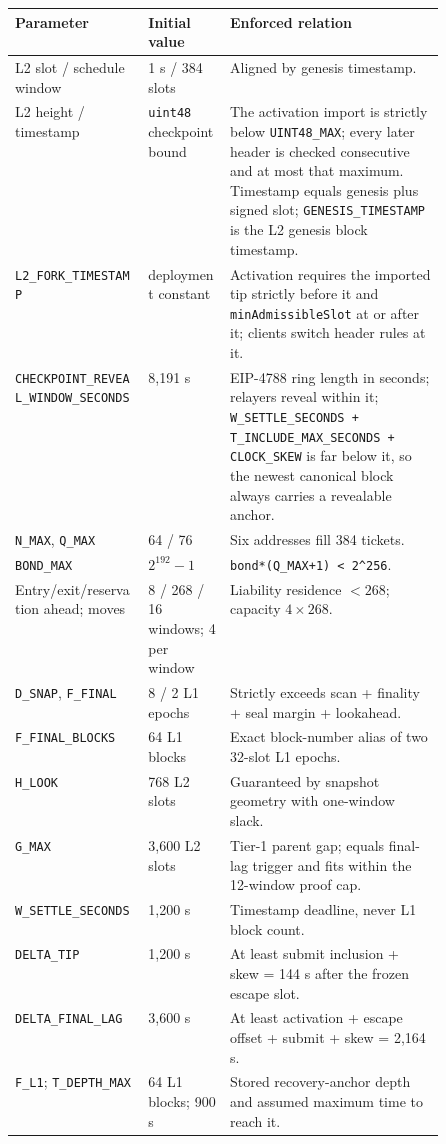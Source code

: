 \documentclass[a4paper,11pt]{article}
\newcommand{\code}[1]{\nolinkurl{#1}}
\begin{document}
\begin{xltabular}{\linewidth}{p{0.31\linewidth}p{0.19\linewidth}X}
\toprule
\textbf{Parameter} & \textbf{Initial value} & \textbf{Enforced relation} \\
\midrule
L2 slot / schedule window & 1 s / 384 slots & Aligned by genesis timestamp. \\
L2 height / timestamp & \code{uint48} checkpoint bound & The activation import is strictly below \code{UINT48_MAX}; every later header is checked consecutive and at most that maximum.  Timestamp equals genesis plus signed slot; \code{GENESIS_TIMESTAMP} is the L2 genesis block timestamp. \\
\code{L2_FORK_TIMESTAMP} & deployment constant & Activation requires the imported tip strictly before it and \code{minAdmissibleSlot} at or after it; clients switch header rules at it. \\
\code{CHECKPOINT_REVEAL_WINDOW_SECONDS} & 8,191 s & EIP-4788 ring length in seconds; relayers reveal within it; \code{W_SETTLE_SECONDS + T_INCLUDE_MAX_SECONDS + CLOCK_SKEW} is far below it, so the newest canonical block always carries a revealable anchor. \\
\code{N_MAX}, \code{Q_MAX} & 64 / 76 & Six addresses fill 384 tickets. \\
\code{BOND_MAX} & $2^{192}-1$ & \code{bond*(Q_MAX+1) < 2^256}. \\
Entry/exit/reservation ahead; moves & 8 / 268 / 16 windows; 4 per window & Liability residence $<268$; capacity $4\times268$. \\
\code{D_SNAP}, \code{F_FINAL} & 8 / 2 L1 epochs & Strictly exceeds scan + finality + seal margin + lookahead. \\
\code{F_FINAL_BLOCKS} & 64 L1 blocks & Exact block-number alias of two 32-slot L1 epochs. \\
\code{H_LOOK} & 768 L2 slots & Guaranteed by snapshot geometry with one-window slack. \\
\code{G_MAX} & 3,600 L2 slots & Tier-1 parent gap; equals final-lag trigger and fits within the 12-window proof cap. \\
\code{W_SETTLE_SECONDS} & 1,200 s & Timestamp deadline, never L1 block count. \\
\code{DELTA_TIP} & 1,200 s & At least submit inclusion + skew = 144 s after the frozen escape slot. \\
\code{DELTA_FINAL_LAG} & 3,600 s & At least activation + escape offset + submit + skew = 2,164 s. \\
\code{F_L1}; \code{T_DEPTH_MAX} & 64 L1 blocks; 900 s & Stored recovery-anchor depth and assumed maximum time to reach it. \\

\end{xltabular}
\end{document}
